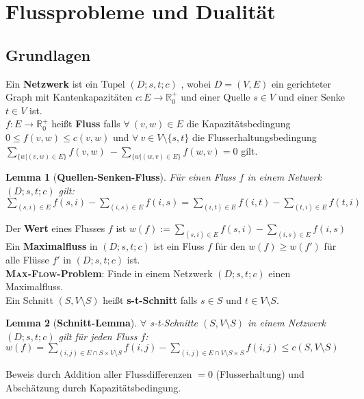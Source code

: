 \documentclass[a4paper,10pt]{scrartcl}
\newcommand{\tbf}{\textbf}
\newcommand{\tsc}{\textsc}
\newcommand{\gGr}{$D = (V,E)$ }
\newcommand{\Gwfktp}{$c: E \rightarrow \mathbb{R}_0^+$ }
\newcommand{\Cut}{$(S,V \setminus S)$ }
\newcommand{\Nw}{$(D;s,t;c)$ }
\newcommand{\Flu}{$f: E \rightarrow \mathbb{R}_0^+$ }
\newtheorem{lemma}{Lemma}
\begin{document}
\newpage
\section{Flussprobleme und Dualität}
\subsection{Grundlagen}
Ein \tbf{Netzwerk} ist ein Tupel \Nw, wobei \gGr ein gerichteter Graph mit Kantenkapazitäten \Gwfktp und einer Quelle $s \in V$ und einer Senke $t \in V$ ist. \\

\Flu heißt \tbf{Fluss} falls $\forall \ (v,w) \in E$ die Kapazitätsbedingung $0 \leq f(v,w) \leq c(v,w)$ und $\forall \ v \in V \setminus \{s,t\}$ die Flusserhaltungsbedingung $\sum_{\{w | (v,w) \in E\}} \limits f(v,w) \ - \sum_{\{w | (w,v) \in E\}} \limits f(w,v) = 0$ gilt. \\

\begin{lemma}[\tbf{Quellen-Senken-Fluss}]
 Für einen Fluss $f$ in einem Netwerk \Nw gilt: \\
 $\sum_{(s,i) \in E} \limits f(s,i) - \sum_{(i,s) \in E} \limits f(i,s) = \sum_{(i,t) \in E} \limits f(i,t) - \sum_{(t,i) \in E} \limits f(t,i)$
\end{lemma}

Der \tbf{Wert} eines Flusses $f$ ist $w(f) := \sum_{(s,i) \in E} \limits f(s,i) - \sum_{(i,s) \in E} \limits f(i,s)$ \\

Ein \tbf{Maximalfluss} in \Nw ist ein Fluss $f$ für den $w(f) \geq w(f')$ für alle Flüsse $f'$ in \Nw ist. \\

\tbf{\tsc{Max-Flow}-Problem}: Finde in einem Netzwerk \Nw einen Maximalfluss. \\

Ein Schnitt \Cut heißt \tbf{s-t-Schnitt} falls $s \in S$ und $t \in V \setminus S$. \\

\begin{lemma}[\tbf{Schnitt-Lemma}]
 $\forall$ s-t-Schnitte \Cut in einem Netzwerk \Nw gilt für jeden Fluss $f$: 
 $w(f) = \sum_{(i,j) \in E \cap S \times V \setminus S} \limits f(i,j) - \sum_{(i,j) \in E \cap V \setminus S \times S} \limits f(i,j) \leq c(S,V \setminus S)$
\end{lemma}

Beweis durch Addition aller Flussdifferenzen $=0$ (Flusserhaltung) und Abschätzung durch Kapazitätsbedingung. \\
\end{document}

